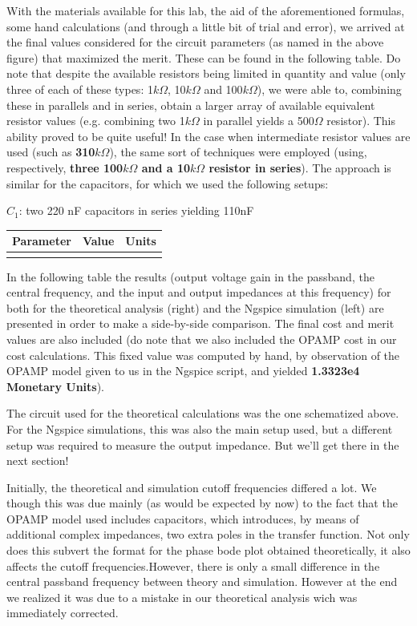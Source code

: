 With the materials available for this lab, the aid of the aforementioned formulas, some hand calculations (and through a little bit of trial and error), we arrived at the final values considered for the circuit parameters (as named in the above figure) that maximized the merit. These can be found in the following table. Do note that despite the available resistors being limited in quantity and value (only three of each of these types: 1$k\Omega$, 10$k\Omega$ and 100$k\Omega$), we were able to, combining these in parallels and in series, obtain a larger array of available equivalent resistor values (e.g. combining two 1$k\Omega$ in parallel yields a 500$\Omega$ resistor). This ability proved to be quite useful! In the case when intermediate resistor values are used (such as \textbf{310$k\Omega$}), the same sort of techniques were employed (using, respectively, \textbf{three 100$k\Omega$ and a 10$k\Omega$ resistor in series}). The approach is similar for the capacitors, for which we used the following setups:

$C_1$: two 220 nF capacitors in series yielding 110nF



\hfill
 \parbox{1\linewidth}{
  \centering
  \begin{tabular}{|l|l|r|}
    \hline    
    {\bf Parameter} & {\bf Value} & {\bf Units }\\ \hline
    
  \label{tab:params}
  \end{tabular}
  }
\par

In the following table the results (output voltage gain in the passband, the central frequency, and the input and output impedances at this frequency) for both for the theoretical analysis (right) and the Ngspice simulation (left) are presented in order to make a side-by-side comparison. The final cost and merit values are also included (do note that we also included the OPAMP cost in our cost calculations. This fixed value was computed by hand, by observation of the OPAMP model given to us in the Ngspice script, and yielded \textbf{1.3323e4 Monetary Units}).\par
The circuit used for the theoretical calculations was the one schematized above. For the Ngspice simulations, this was also the main setup used, but a different setup was required to measure the output impedance. But we'll get there in the next section!\par
Initially, the theoretical and simulation cutoff frequencies differed a lot. We though this was due mainly (as would be expected by now) to the fact that the OPAMP model used includes capacitors, which introduces, by means of additional complex impedances, two extra poles in the transfer function. Not only does this subvert the format for the phase bode plot obtained theoretically, it also affects the cutoff frequencies.However, there is only a small difference in the central passband frequency between theory and simulation. However at the end we realized it was due to a mistake in our theoretical analysis wich was immediately corrected.  \par

